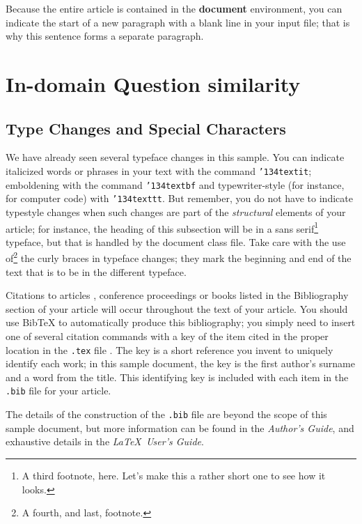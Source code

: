 \documentclass{sigkddExp}
\begin{document}
Because the entire article is contained in
the \textbf{document} environment, you can indicate the
start of a new paragraph with a blank line in your
input file; that is why this sentence forms a separate paragraph.

\section{In-domain Question similarity}
\subsection{Type Changes and Special Characters}
We have already seen several typeface changes in this sample.  You
can indicate italicized words or phrases in your text with
the command \texttt{{\char'134}textit}; emboldening with the
command \texttt{{\char'134}textbf}
and typewriter-style (for instance, for computer code) with
\texttt{{\char'134}texttt}.  But remember, you do not
have to indicate typestyle changes when such changes are
part of the \textit{structural} elements of your
article; for instance, the heading of this subsection will
be in a sans serif\footnote{A third footnote, here.
Let's make this a rather short one to
see how it looks.} typeface, but that is handled by the
document class file. Take care with the use
of\footnote{A fourth, and last, footnote.}
the curly braces in typeface changes; they mark
the beginning and end of
the text that is to be in the different typeface.

Citations to articles \cite{bowman:reasoning, clark:pct, braams:babel, herlihy:methodology},
conference
proceedings \cite{clark:pct} or books \cite{salas:calculus, Lamport:LaTeX} listed
in the Bibliography section of your
article will occur throughout the text of your article.
You should use BibTeX to automatically produce this bibliography;
you simply need to insert one of several citation commands with
a key of the item cited in the proper location in
the \texttt{.tex} file \cite{Lamport:LaTeX}.
The key is a short reference you invent to uniquely
identify each work; in this sample document, the key is
the first author's surname and a
word from the title.  This identifying key is included
with each item in the \texttt{.bib} file for your article.

The details of the construction of the \texttt{.bib} file
are beyond the scope of this sample document, but more
information can be found in the \textit{Author's Guide},
and exhaustive details in the \textit{\LaTeX\ User's
Guide}\cite{singh2016question}.
\end{document}
